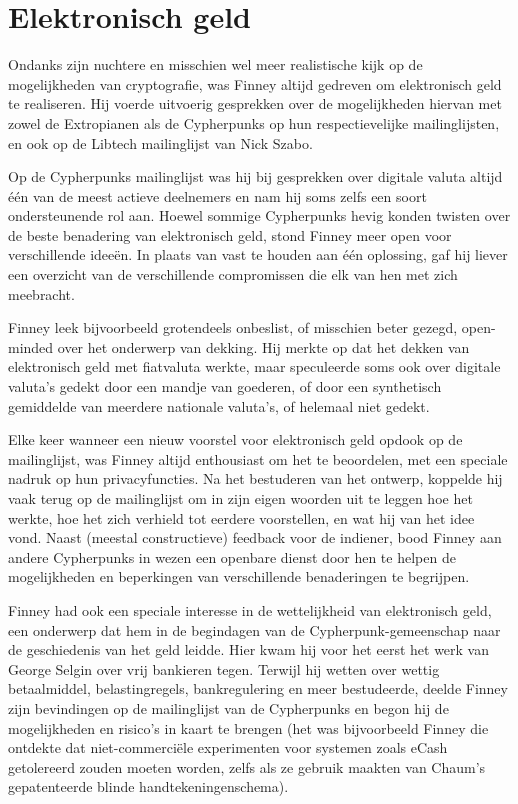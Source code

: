 \documentclass[
  a5paper,
  smalldemyvopaper,11pt,twoside,onecolumn,openright,extrafontsizes]{memoir}
\begin{document}
\section{Elektronisch geld}\label{elektronisch-geld}

Ondanks zijn nuchtere en misschien wel meer realistische kijk op de
mogelijkheden van cryptografie, was Finney altijd gedreven om
elektronisch geld te realiseren. Hij voerde uitvoerig gesprekken over de
mogelijkheden hiervan met zowel de Extropianen als de Cypherpunks op hun
respectievelijke mailinglijsten, en ook op de Libtech mailinglijst van
Nick Szabo.

Op de Cypherpunks mailinglijst was hij bij gesprekken over digitale
valuta altijd één van de meest actieve deelnemers en nam hij soms zelfs
een soort ondersteunende rol aan. Hoewel sommige Cypherpunks hevig
konden twisten over de beste benadering van elektronisch geld, stond
Finney meer open voor verschillende ideeën. In plaats van vast te houden
aan één oplossing, gaf hij liever een overzicht van de verschillende
compromissen die elk van hen met zich meebracht.

Finney leek bijvoorbeeld grotendeels onbeslist, of misschien beter
gezegd, open-minded over het onderwerp van dekking. Hij merkte op dat
het dekken van elektronisch geld met fiatvaluta werkte, maar speculeerde
soms ook over digitale valuta's gedekt door een mandje van goederen, of
door een synthetisch gemiddelde van meerdere nationale valuta's, of
helemaal niet gedekt.

Elke keer wanneer een nieuw voorstel voor elektronisch geld opdook op de
mailinglijst, was Finney altijd enthousiast om het te beoordelen, met
een speciale nadruk op hun privacyfuncties. Na het bestuderen van het
ontwerp, koppelde hij vaak terug op de mailinglijst om in zijn eigen
woorden uit te leggen hoe het werkte, hoe het zich verhield tot eerdere
voorstellen, en wat hij van het idee vond. Naast (meestal constructieve)
feedback voor de indiener, bood Finney aan andere Cypherpunks in wezen
een openbare dienst door hen te helpen de mogelijkheden en beperkingen
van verschillende benaderingen te begrijpen.

Finney had ook een speciale interesse in de wettelijkheid van
elektronisch geld, een onderwerp dat hem in de begindagen van de
Cypherpunk-gemeenschap naar de geschiedenis van het geld leidde. Hier
kwam hij voor het eerst het werk van George Selgin over vrij bankieren
tegen. Terwijl hij wetten over wettig betaalmiddel, belastingregels,
bankregulering en meer bestudeerde, deelde Finney zijn bevindingen op de
mailinglijst van de Cypherpunks en begon hij de mogelijkheden en
risico's in kaart te brengen (het was bijvoorbeeld Finney die ontdekte
dat niet-commerciële experimenten voor systemen zoals eCash getolereerd
zouden moeten worden, zelfs als ze gebruik maakten van Chaum's
gepatenteerde blinde handtekeningenschema).
\end{document}
